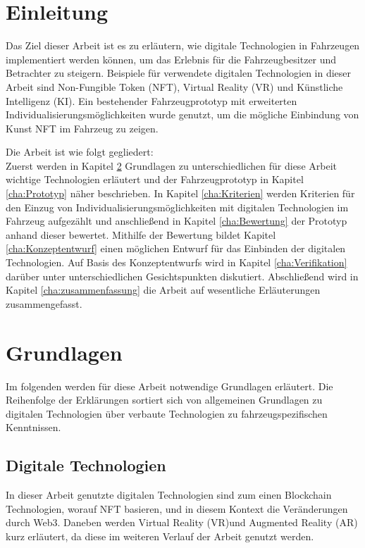 \chapter{Einleitung}
\label{cha:Einleitung}
Das Ziel dieser Arbeit ist es zu erläutern, wie digitale Technologien in Fahrzeugen implementiert werden können, um das Erlebnis für die Fahrzeugbesitzer und Betrachter zu steigern. 
Beispiele für verwendete digitalen Technologien in dieser Arbeit sind Non-Fungible Token (NFT), Virtual Reality (VR) und Künstliche Intelligenz (KI).
Ein bestehender Fahrzeugprototyp mit erweiterten Individualisierungsmöglichkeiten wurde genutzt, um die mögliche Einbindung von Kunst NFT im Fahrzeug zu zeigen.

Die Arbeit ist wie folgt gegliedert:\\
Zuerst werden in Kapitel \ref{cha:Grundlagen} Grundlagen zu unterschiedlichen für diese Arbeit wichtige Technologien erläutert und der Fahrzeugprototyp in Kapitel \ref{cha:Prototyp} näher beschrieben. In Kapitel \ref{cha:Kriterien} werden Kriterien für den Einzug von Individualisierungsmöglichkeiten mit digitalen Technologien im Fahrzeug aufgezählt und anschließend in Kapitel \ref{cha:Bewertung} der Prototyp anhand dieser bewertet. Mithilfe der Bewertung bildet Kapitel \ref{cha:Konzeptentwurf} einen möglichen Entwurf für das Einbinden der digitalen Technologien. Auf Basis des Konzeptentwurfs wird in Kapitel \ref{cha:Verifikation} darüber unter unterschiedlichen Gesichtspunkten diskutiert. Abschließend wird in Kapitel \ref{cha:zusammenfassung} die Arbeit auf wesentliche Erläuterungen zusammengefasst.

\chapter{Grundlagen}
\label{cha:Grundlagen}
Im folgenden werden für diese Arbeit notwendige Grundlagen erläutert. Die Reihenfolge der Erklärungen sortiert sich von allgemeinen Grundlagen zu digitalen Technologien über verbaute Technologien zu fahrzeugspezifischen Kenntnissen.
\section{Digitale Technologien}
In dieser Arbeit genutzte digitalen Technologien sind zum einen Blockchain Technologien, worauf NFT basieren, und in diesem Kontext die Veränderungen durch Web3. Daneben werden Virtual Reality (VR)und Augmented Reality (AR) kurz erläutert, da diese im weiteren Verlauf der Arbeit genutzt werden.
